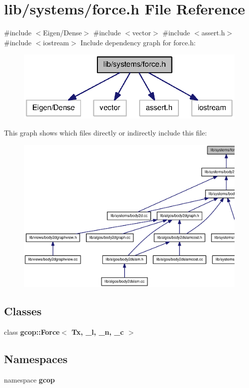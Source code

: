 \section{lib/systems/force.h \-File \-Reference}
\label{force_8h}
{\ttfamily \#include $<$\-Eigen/\-Dense$>$}\*
{\ttfamily \#include $<$vector$>$}\*
{\ttfamily \#include $<$assert.\-h$>$}\*
{\ttfamily \#include $<$iostream$>$}\*
\-Include dependency graph for force.\-h\-:
\nopagebreak
\begin{figure}[H]
\begin{center}
\leavevmode
\includegraphics[width=320pt]{force_8h__incl}
\end{center}
\end{figure}
\-This graph shows which files directly or indirectly include this file\-:
\nopagebreak
\begin{figure}[H]
\begin{center}
\leavevmode
\includegraphics[width=350pt]{force_8h__dep__incl}
\end{center}
\end{figure}
\subsection*{\-Classes}
\begin{DoxyCompactItemize}
\item 
class {\bf gcop\-::\-Force$<$ Tx, \-\_\-l, \-\_\-n, \-\_\-c $>$}
\end{DoxyCompactItemize}
\subsection*{\-Namespaces}
\begin{DoxyCompactItemize}
\item 
namespace {\bf gcop}
\end{DoxyCompactItemize}
